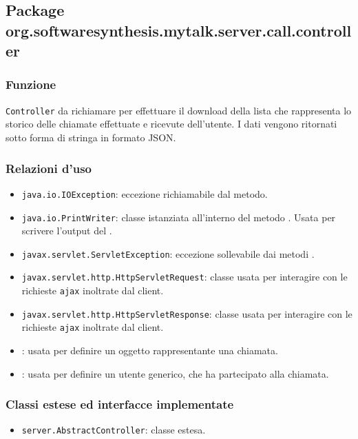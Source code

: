 \subsection{Package org.softwaresynthesis.mytalk.server.call.controller}\label{sec:callServlet}


\subsubsection*{Funzione}
\texttt{Controller} da richiamare per effettuare il download della lista che rappresenta lo storico delle chiamate effettuate e ricevute dell'utente. I dati vengono ritornati sotto forma di stringa in formato JSON.

\subsubsection*{Relazioni d'uso}
\begin{itemize}
	\item \texttt{java.io.IOException}: eccezione richiamabile dal metodo.
	\item \texttt{java.io.PrintWriter}: classe istanziata all'interno del metodo . Usata per scrivere l'output del .
	\item \texttt{javax.servlet.ServletException}: eccezione sollevabile dai metodi .
	\item \texttt{javax.servlet.http.HttpServletRequest}: classe usata per interagire con le richieste \texttt{ajax} inoltrate dal client.
	\item \texttt{javax.servlet.http.HttpServletResponse}: classe usata per interagire con le richieste \texttt{ajax} inoltrate dal client.
	\item {}: usata per definire un oggetto rappresentante una chiamata.
	\item {}: usata per definire un utente generico, che ha partecipato alla chiamata.
\end{itemize}

\subsubsection*{Classi estese ed interfacce implementate}
\begin{itemize}
	\item \texttt{server.AbstractController}: classe estesa.
\end{itemize}

